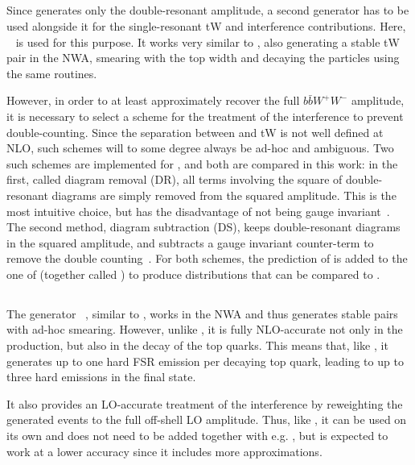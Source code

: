 \subsection{\texorpdfstring{\ST}{ST\_wtch}}

Since \hvq generates only the double-resonant \ttbar amplitude, a second generator has to be used alongside it for the single-resonant tW and \tttW interference contributions. Here, \ST~\cite{Re:2010bp} is used for this purpose. It works very similar to \hvq, also generating a stable tW pair in the NWA, smearing with the top width and decaying the particles using the same routines.

However, in order to at least approximately recover the full $b \bar{b} W^+ W^-$ amplitude, it is necessary to select a scheme for the treatment of the \tttW interference to prevent double-counting. Since the separation between \ttbar and tW is not well defined at NLO, such schemes will to some degree always be ad-hoc and ambiguous. Two such schemes are implemented for \ST, and both are compared in this work: in the first, called diagram removal (DR), all terms involving the square of double-resonant diagrams are simply removed from the squared amplitude. This is the most intuitive choice, but has the disadvantage of not being gauge invariant~\cite{Frixione:2008yi}. The second method, diagram subtraction (DS), keeps double-resonant diagrams in the squared amplitude, and subtracts a gauge invariant counter-term to remove the double counting~\cite{Tait:1999cf,Frixione:2008yi,Re:2010bp}. For both schemes, the prediction of \ST is added to the one of \hvq (together called \tttWsum) to produce distributions that can be compared to \bbfourl.

\subsection{\texorpdfstring{\ttb}{ttb\_NLO\_dec}}

The generator \ttb~\cite{Campbell:2014kua}, similar to \hvq, works in the NWA and thus generates stable \ttbar pairs with ad-hoc smearing. However, unlike \hvq, it is fully NLO-accurate not only in the production, but also in the decay of the top quarks. This means that, like \bbfourl, it generates up to one hard FSR emission per decaying top quark, leading to up to three hard emissions in the final state. 

It also provides an LO-accurate treatment of the \tttW interference by reweighting the generated \ttbar events to the full off-shell LO amplitude. Thus, like \bbfourl, it can be used on its own and does not need to be added together with e.g. \ST, but is expected to work at a lower accuracy since it includes more approximations.


